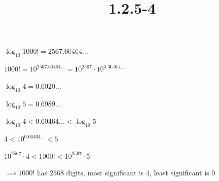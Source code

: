 \documentclass{article}
\title{1.2.5-4}
\begin{document}
\maketitle

$\log_{10}{1000!} = 2567.60464\ldots$

$1000! = 10^{2567.60464\ldots} = 10^{2567} \cdot 10^{0.60464\ldots}$

$\log_{10}{4} = 0.6020\ldots$

$\log_{10}{5} = 0.6989\ldots$

$\log_{10}{4} < 0.60464\ldots < \log_{10}{5}$

$4 < 10^{0.60464\ldots} < 5$

$10^{2567} \cdot 4 < 1000! < 10^{2567} \cdot 5$

$\implies 1000!$ has $2568$ digits, most significant is $4$, least significant is $0$
\end{document}
